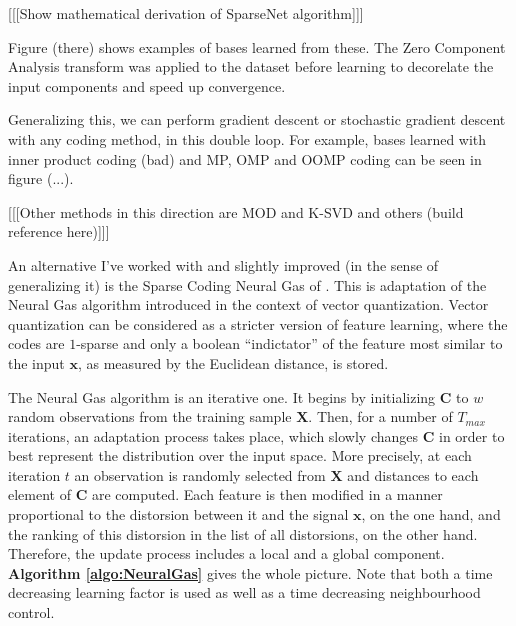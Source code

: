\documentclass[12pt,a4paper,oneside,english]{UPBThesis}
\begin{document}
[[[Show mathematical derivation of SparseNet algorithm]]]

Figure (there) shows examples of bases learned from these. The Zero Component Analysis transform was applied to the dataset before learning to decorelate the input components and speed up convergence.

Generalizing this, we can perform gradient descent or stochastic gradient descent with any coding method, in this double loop. For example, bases learned with inner product coding (bad) and MP, OMP and OOMP coding can be seen in figure (...).

[[[Other methods in this direction are MOD and K-SVD and others (build reference here)]]]

An alternative I've worked with and slightly improved (in the sense of generalizing it) is the Sparse Coding Neural Gas of \cite{sparse-coding-neural-gas-1,sparse-coding-neural-gas-2,sparse-coding-neural-gas-3, sparse-coding-neural-gas-4}. This is adaptation of the Neural Gas \cite{neural-gas-1,neural-gas-2} algorithm introduced in the context of vector quantization. Vector quantization can be considered as a stricter version of feature learning, where the codes are $1$-sparse and only a boolean ``indictator'' of the feature most similar to the input $\textbf{x}$, as measured by the Euclidean distance, is stored.

The Neural Gas algorithm is an iterative one. It begins by initializing $\textbf{C}$ to $w$ random observations from the training sample $\textbf{X}$. Then, for a number of $T_{max}$ iterations, an adaptation process takes place, which slowly changes $\textbf{C}$ in order to best represent the distribution over the input space. More precisely, at each iteration $t$ an observation is randomly selected from $\textbf{X}$ and distances to each element of $\textbf{C}$ are computed. Each feature is then modified in a manner proportional to the distorsion between it and the signal $\textbf{x}$, on the one hand, and the ranking of this distorsion in the list of all distorsions, on the other hand. Therefore, the update process includes a local and a global component. \textbf{Algorithm \ref{algo:NeuralGas}} gives the whole picture. Note that both a time decreasing learning factor is used as well as a time decreasing neighbourhood control. 
\end{document}
